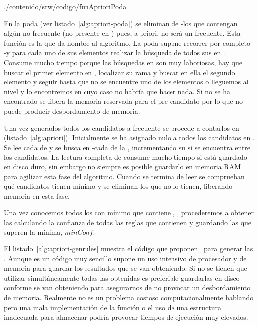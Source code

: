 
                       {./contenido/srw/codigo/funAprioriPoda}


En la poda (ver listado~\ref{alg:apriori-poda}) se eliminan de \aprioriL[k-1]-\aprioriC los \kitemsets que contengan algún \kitemsets[(k-1)] no frecuente (no presente en \aprioriL[k-1]) pues, a priori, no será un \kitemset frecuente. Esta función es la que da nombre al algoritmo. La poda supone recorrer por completo \aprioriL[k-1]-\aprioriC y para cada uno de sus elementos realizar la búsqueda de todos sus \kitemsets[(k-1)] en \aprioriL[k-1]. Consume mucho tiempo porque las búsquedas en \aprioriL[k-1] son muy laboriosas, hay que buscar el primer elemento en \aprioriL[1], localizar su rama \aprioriL[2] y buscar en ella el segundo elemento y seguir hasta que no se encuentre uno de los elementos o lleguemos al nivel \aprioriL[k-1] y lo encontremos en cuyo caso no habría que hacer nada. Si no se ha encontrado se libera la memoria reservada para el pre-candidato por lo que no puede producir desbordamiento de memoria.


Una vez generados todos los candidatos a \kitemset frecuente se procede a contarlos en \D (listado~\ref{alg:apriori}). Inicialmente se ha asignado \soporte nulo a todos los candidatos en \aprioriC. Se lee cada \transaccion de \D y se busca en \aprioriL[k-1]-\aprioriC cada \kitemset de la \transaccion, incrementando su \soporte si se encuentra entre los candidatos. La lectura completa de \D consume mucho tiempo si está guardado en disco duro, sin embargo no siempre es posible guardarlo en memoria RAM para agilizar esta fase del algoritmo. Cuando se termina de leer \D se comprueban qué candidatos tienen \soporte mínimo y se eliminan los que no lo tienen, liberando memoria en esta fase.







Una vez conocemos todos los \itemsets con \soporte mínimo que contiene \D, \aprioriL, procederemos a obtener las \ARs calculando la confianza de todas las reglas que contienen y guardando las que superen la \confianza mínima, $minConf$.

El listado~\ref{alg:apriori-genrules} muestra el código que proponen~\citeauthor{AgrawalSrikant-FastAlgorithmsForMiningAssociationRules-LARGO-1994} para generar las \ars. Aunque es un código muy sencillo supone un uso intensivo de procesador y de memoria para guardar los resultados que se van obteniendo. Si no se tienen que utilizar simultáneamente todas las \ars obtenidas es preferible guardarlas en disco conforme se van obteniendo para asegurarnos de no provocar un desbordamiento de memoria. Realmente no es un problema costoso computacionalmente hablando pero una mala implementación de la función o el uso de una estructura inadecuada para almacenar \aprioriL podría provocar tiempos de ejecución muy elevados.

